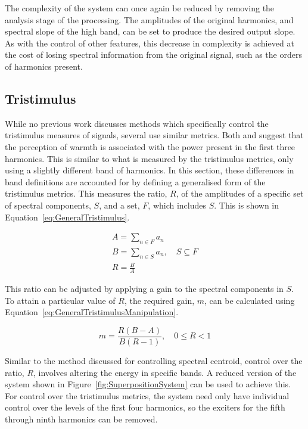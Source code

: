 		The complexity of the system can once again be reduced by removing the analysis stage of the processing.
		The amplitudes of the original harmonics, and spectral slope of the high band, can be set to produce the
		desired output slope. As with the control of other features, this decrease in complexity is achieved at the
		cost of losing spectral information from the original signal, such as the orders of harmonics present.

	\subsection{Tristimulus}
	\label{sec:FeatureControl-Parameterisation-Tristimulus}
		While no previous work discusses methods which specifically control the tristimulus measures of signals,
		several use similar metrics. Both \cite{williams2010perceptually} and \cite{zacharakis2011an} suggest that
		the perception of warmth is associated with the power present in the first three harmonics. This is similar
		to what is measured by the tristimulus metrics, only using a slightly different band of harmonics. In this
		section, these differences in band definitions are accounted for by defining a  generalised form of the
		tristimulus metrics. This measures the ratio, $R$, of the amplitudes of a specific set of spectral
		components, $S$, and a set, $F$, which includes $S$. This is shown in Equation~\ref{eq:GeneralTristimulus}.

		\begin{gather}
			A = \sum_{n \in F} a_{n} \nonumber \\
			B = \sum_{n \in S} a_{n}, \quad S \subseteq F \nonumber \\
			R = \frac{B}{A}
			\label{eq:GeneralTristimulus}
		\end{gather}

		This ratio can be adjusted by applying a gain to the spectral components in $S$. To attain a particular
		value of $R$, the required gain, $m$, can be calculated using
		Equation~\ref{eq:GeneralTristimulusManipulation}.

		\begin{equation}
			m = \frac{R(B - A)}{B(R - 1)}, \quad 0 \leq R < 1
			\label{eq:GeneralTristimulusManipulation}
		\end{equation}

		Similar to the method discussed for controlling spectral centroid, control over the ratio, $R$, involves
		altering the energy in specific bands. A reduced version of the system shown in
		Figure~\ref{fig:SuperpositionSystem} can be used to achieve this. For control over the tristimulus metrics,
		the system need only have individual control over the levels of the first four harmonics, so the exciters
		for the fifth through ninth harmonics can be removed.

